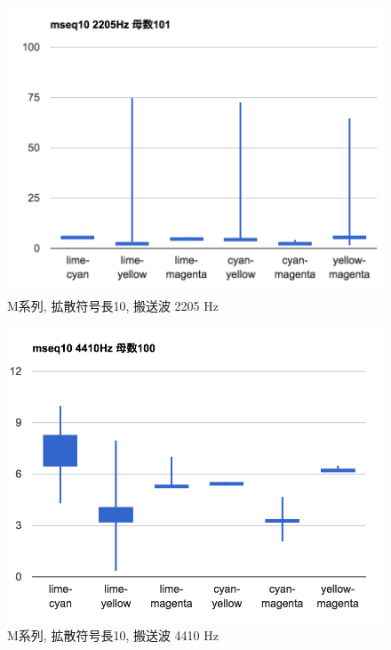 \begin{figure}[p]
  \centering
  \includegraphics[clip,width=1.05\hsize]{img/m10_2205.png}
  \caption{M系列, 拡散符号長10, 搬送波 2205 Hz}\label{fig:m10Z2205}
\end{figure}

\begin{figure}[p]
  \centering
  \includegraphics[clip,width=1.05\hsize]{img/m10_4410.png}
  \caption{M系列, 拡散符号長10, 搬送波 4410 Hz}\label{fig:m10Z4410}
\end{figure}


